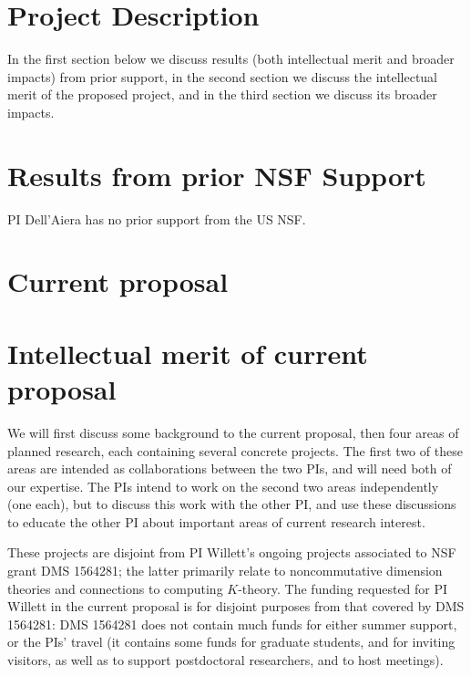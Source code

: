 \documentclass[11pt]{article}
\theoremstyle{plain}
\theoremstyle{definition}
\theoremstyle{remark}
\begin{document}
\section*{Project Description}



In the first section below we discuss results (both intellectual merit and broader impacts) from prior support, in the second section we discuss the intellectual merit of the proposed project, and in the third section we discuss its broader impacts.
 
\section{Results from prior NSF Support}

PI Dell'Aiera has no prior support from the US NSF.  

\section{Current proposal}


\section{Intellectual merit of current proposal}\label{imc}

We will first discuss some background to the current proposal, then four areas of planned research, each containing several concrete projects.  The first two of these areas are intended as collaborations between the two PIs, and will need both of our expertise.  The PIs intend to work on the second two areas independently (one each), but to discuss this work with the other PI, and use these discussions to educate the other PI about important areas of current research interest.  

These projects are disjoint from PI Willett's ongoing projects associated to NSF grant DMS 1564281; the latter primarily relate to noncommutative dimension theories and connections to computing $K$-theory.  The funding requested for PI Willett in the current proposal is for disjoint purposes from that covered by DMS 1564281: DMS 1564281 does not contain much funds for either summer support, or the PIs' travel (it contains some funds for graduate students, and for inviting visitors, as well as to support postdoctoral researchers, and to host meetings).
\end{document}
